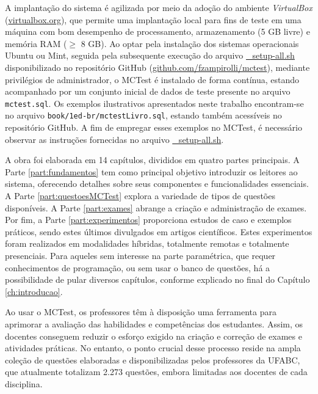A implantação do sistema é agilizada por meio da adoção do ambiente \textit{VirtualBox} (\href{https://www.virtualbox.org}{virtualbox.org}), que permite uma implantação local para fins de teste em uma máquina com bom desempenho de processamento, armazenamento (5 GB livre) e memória RAM ($\geq$ 8 GB). Ao optar pela instalação dos sistemas operacionais Ubuntu ou Mint, seguida pela subsequente execução do arquivo \href{https://github.com/fzampirolli/mctest/blob/master/_setup-all.sh}{\_setup-all.sh} disponibilizado no repositório GitHub (\href{https://github.com/fzampirolli/mctest}{github.com/fzampirolli/mctest}), mediante privilégios de administrador, o MCTest é instalado de forma contínua, estando acompanhado por um conjunto inicial de dados de teste presente no arquivo \verb|mctest.sql|. Os exemplos ilustrativos apresentados neste trabalho encontram-se no arquivo \verb|book/1ed-br/mctestLivro.sql|, estando também acessíveis no repositório GitHub. A fim de empregar esses exemplos no MCTest, é necessário observar as instruções fornecidas no arquivo \href{https://github.com/fzampirolli/mctest/blob/master/_setup-all.sh}{\_setup-all.sh}.

A obra foi elaborada em 14 capítulos, divididos em quatro partes principais. A Parte \ref{part:fundamentos} tem como principal objetivo introduzir os leitores ao sistema, oferecendo detalhes sobre seus componentes e funcionalidades essenciais. A Parte \ref{part:questoesMCTest} explora a variedade de tipos de questões disponíveis. A Parte \ref{part:exames} abrange a criação e administração de exames. Por fim, a Parte \ref{part:experimentos} proporciona estudos de caso e exemplos práticos, sendo estes últimos divulgados em artigos científicos. Estes experimentos foram realizados em modalidades híbridas, totalmente remotas e totalmente presenciais. 
%
Para aqueles sem interesse na parte paramétrica, que requer conhecimentos de programação, ou sem usar o banco de questões, há a possibilidade de pular diversos capítulos, conforme explicado no final do Capítulo \ref{ch:introducao}.

Ao usar o MCTest, os professores têm à disposição uma ferramenta para aprimorar a avaliação das habilidades e competências dos estudantes. Assim, os docentes conseguem reduzir o esforço exigido na criação e correção de exames e atividades práticas. No entanto, o ponto crucial desse processo reside na ampla coleção de questões elaboradas e disponibilizadas pelos professores da UFABC, que atualmente totalizam 2.273 questões, embora limitadas aos docentes de cada disciplina.

